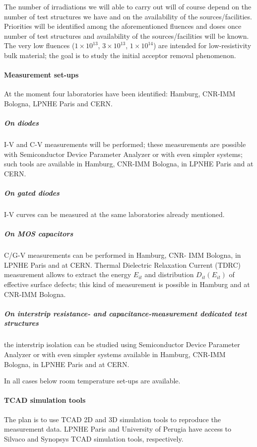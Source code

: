 \documentclass[dvips,12pt]{article}
\begin{document}
\noindent The number of irradiations we will able to carry out will of course depend on the 
number of test structures we have and on the availability of the sources/facilities. Priorities 
will be identified among the aforementioned fluences and doses once number of test structures 
and  availability of the sources/facilities will be known. 
\noindent The very low fluences ($1\times10^{13}$,  
$3\times10^{13}$, $1\times10^{14}$) are intended for low-resistivity bulk material; the goal 
is to study the initial acceptor removal phenomenon. 

\paragraph{Measurement set-ups} At the moment four laboratories have been identified: Hamburg, CNR-IMM Bologna, LPNHE Paris and CERN.

\subparagraph{On diodes} I-V and C-V measurements will be performed; these 
measurements are possible with Semiconductor Device Parameter Analyzer or 
with even simpler systems; such tools are available in Hamburg, CNR-IMM Bologna, in LPNHE Paris
and at CERN. 

\subparagraph{On gated diodes} I-V curves can be measured at the same laboratories
 already mentioned.

\subparagraph{On MOS capacitors}  C/G-V measurements can be performed in Hamburg, CNR-
IMM Bologna, in  LPNHE Paris and at CERN. Thermal Dielectric Relaxation Current (TDRC) 
measurement allows to extract the energy 
 $E_{it}$ and distribution  $D_{it}(E_{it})$ of effective surface defects; this kind of measurement 
 is possible in Hamburg and at CNR-IMM Bologna.

\subparagraph{On  interstrip resistance- and capacitance-measurement dedicated test structures} 
the interstrip isolation  can be studied  using 
Semiconductor Device Parameter Analyzer or with even simpler systems available in Hamburg, CNR-IMM Bologna, in LPNHE Paris
and at CERN. 

\noindent In all cases below room temperature set-ups are available.

\paragraph{TCAD simulation tools}The plan is to use TCAD 2D and 3D simulation tools 
to reproduce the measurement data. LPNHE Paris and University of Perugia have access to 
Silvaco and Synopsys TCAD simulation tools, respectively. 
\end{document}
